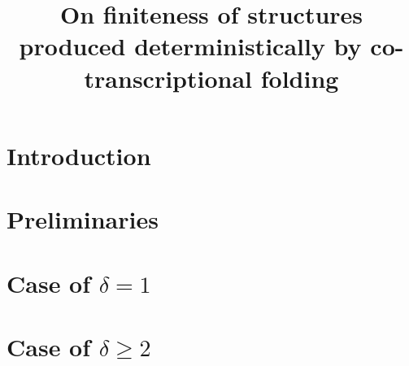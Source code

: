 \documentclass[runningheads]{llncs}
\title{On finiteness of structures produced deterministically by co-transcriptional folding}
\author{}
\date{}
\begin{document}
\maketitle

\section{Introduction}


\section{Preliminaries}


\section{Case of $\delta = 1$}


\section{Case of $\delta \geq 2$}


  
\end{document}

